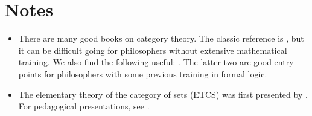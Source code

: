 \section{Notes}

\begin{itemize}
\item There are many good books on category theory.  The classic
  reference is \citep{cwm}, but it can be difficult going for
  philosophers without extensive mathematical training.  We also find
  the following useful: \citep{borceux,awodey-book,vanoosten}.  The
  latter two are good entry points for philosophers with some previous
  training in formal logic.
\item The elementary theory of the category of sets (ETCS) was first
  presented by \cite{lawvere-etcs}.  For pedagogical presentations,
  see \cite{lawvere-sets,leinster}.
\end{itemize}


































